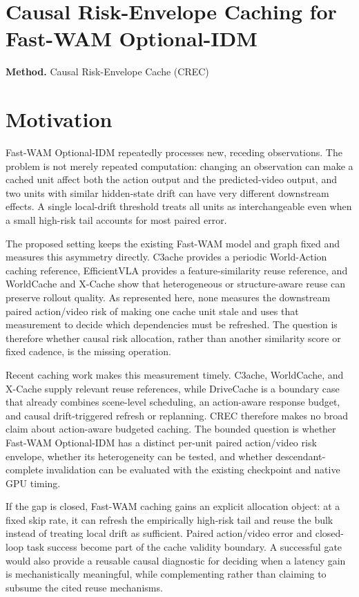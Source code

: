 \documentclass[10pt,a4paper]{article}
\begin{document}
\section*{Causal Risk-Envelope Caching for Fast-WAM Optional-IDM}
\textbf{Method.} Causal Risk-Envelope Cache (CREC)
\section*{Motivation}
Fast-WAM Optional-IDM repeatedly processes new, receding observations. The problem is not merely repeated computation: changing an observation can make a cached unit affect both the action output and the predicted-video output, and two units with similar hidden-state drift can have very different downstream effects. A single local-drift threshold treats all units as interchangeable even when a small high-risk tail accounts for most paired error.

The proposed setting keeps the existing Fast-WAM model and graph fixed and measures this asymmetry directly. C3ache provides a periodic World-Action caching reference, EfficientVLA provides a feature-similarity reuse reference, and WorldCache and X-Cache show that heterogeneous or structure-aware reuse can preserve rollout quality. As represented here, none measures the downstream paired action/video risk of making one cache unit stale and uses that measurement to decide which dependencies must be refreshed. The question is therefore whether causal risk allocation, rather than another similarity score or fixed cadence, is the missing operation.

Recent caching work makes this measurement timely. C3ache, WorldCache, and X-Cache supply relevant reuse references, while DriveCache is a boundary case that already combines scene-level scheduling, an action-aware response budget, and causal drift-triggered refresh or replanning. CREC therefore makes no broad claim about action-aware budgeted caching. The bounded question is whether Fast-WAM Optional-IDM has a distinct per-unit paired action/video risk envelope, whether its heterogeneity can be tested, and whether descendant-complete invalidation can be evaluated with the existing checkpoint and native GPU timing.

If the gap is closed, Fast-WAM caching gains an explicit allocation object: at a fixed skip rate, it can refresh the empirically high-risk tail and reuse the bulk instead of treating local drift as sufficient. Paired action/video error and closed-loop task success become part of the cache validity boundary. A successful gate would also provide a reusable causal diagnostic for deciding when a latency gain is mechanistically meaningful, while complementing rather than claiming to subsume the cited reuse mechanisms.
\end{document}
